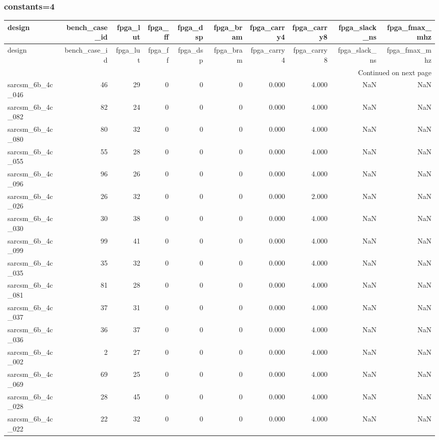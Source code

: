 \documentclass{article}
\begin{document}
\subsubsection*{constants=4}
\begin{longtable}{lrrrrrrrrr}
\toprule
design & bench\_case\_id & fpga\_lut & fpga\_ff & fpga\_dsp & fpga\_bram & fpga\_carry4 & fpga\_carry8 & fpga\_slack\_ns & fpga\_fmax\_mhz \\
\midrule
\endfirsthead
\toprule
design & bench\_case\_id & fpga\_lut & fpga\_ff & fpga\_dsp & fpga\_bram & fpga\_carry4 & fpga\_carry8 & fpga\_slack\_ns & fpga\_fmax\_mhz \\
\midrule
\endhead
\midrule
\multicolumn{10}{r}{Continued on next page} \\
\midrule
\endfoot
\bottomrule
\endlastfoot
sarcsm\_6b\_4c\_046 & 46 & 29 & 0 & 0 & 0 & 0.000 & 4.000 & NaN & NaN \\
sarcsm\_6b\_4c\_082 & 82 & 24 & 0 & 0 & 0 & 0.000 & 4.000 & NaN & NaN \\
sarcsm\_6b\_4c\_080 & 80 & 32 & 0 & 0 & 0 & 0.000 & 4.000 & NaN & NaN \\
sarcsm\_6b\_4c\_055 & 55 & 28 & 0 & 0 & 0 & 0.000 & 4.000 & NaN & NaN \\
sarcsm\_6b\_4c\_096 & 96 & 26 & 0 & 0 & 0 & 0.000 & 4.000 & NaN & NaN \\
sarcsm\_6b\_4c\_026 & 26 & 32 & 0 & 0 & 0 & 0.000 & 2.000 & NaN & NaN \\
sarcsm\_6b\_4c\_030 & 30 & 38 & 0 & 0 & 0 & 0.000 & 4.000 & NaN & NaN \\
sarcsm\_6b\_4c\_099 & 99 & 41 & 0 & 0 & 0 & 0.000 & 4.000 & NaN & NaN \\
sarcsm\_6b\_4c\_035 & 35 & 32 & 0 & 0 & 0 & 0.000 & 4.000 & NaN & NaN \\
sarcsm\_6b\_4c\_081 & 81 & 28 & 0 & 0 & 0 & 0.000 & 4.000 & NaN & NaN \\
sarcsm\_6b\_4c\_037 & 37 & 31 & 0 & 0 & 0 & 0.000 & 4.000 & NaN & NaN \\
sarcsm\_6b\_4c\_036 & 36 & 37 & 0 & 0 & 0 & 0.000 & 4.000 & NaN & NaN \\
sarcsm\_6b\_4c\_002 & 2 & 27 & 0 & 0 & 0 & 0.000 & 4.000 & NaN & NaN \\
sarcsm\_6b\_4c\_069 & 69 & 25 & 0 & 0 & 0 & 0.000 & 4.000 & NaN & NaN \\
sarcsm\_6b\_4c\_028 & 28 & 45 & 0 & 0 & 0 & 0.000 & 4.000 & NaN & NaN \\
sarcsm\_6b\_4c\_022 & 22 & 32 & 0 & 0 & 0 & 0.000 & 4.000 & NaN & NaN \\

\end{longtable}
\end{document}
